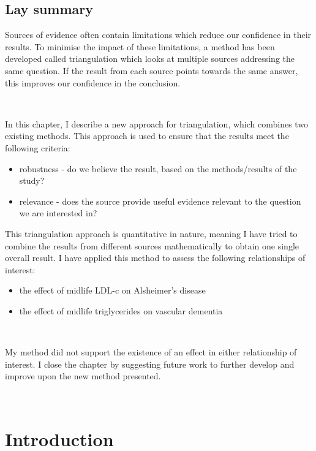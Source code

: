 \documentclass[a4paper, twoside]{templates/ociamthesis}
\providecommand{\tightlist}{%
  \setlength{\itemsep}{0pt}\setlength{\parskip}{0pt}}
\begin{document}
\begin{laybox}

\hypertarget{lay-summary-6}{%
\section*{Lay summary}\label{lay-summary-6}}

Sources of evidence often contain limitations which reduce our confidence in their results. To minimise the impact of these limitations, a method has been developed called triangulation which looks at multiple sources addressing the same question. If the result from each source points towards the same answer, this improves our confidence in the conclusion.

~

In this chapter, I describe a new approach for triangulation, which combines two existing methods. This approach is used to ensure that the results meet the following criteria:

\begin{itemize}
\tightlist
\item
  robustness - do we believe the result, based on the methods/results of the study?
\item
  relevance - does the source provide useful evidence relevant to the question we are interested in?
\end{itemize}

This triangulation approach is quantitative in nature, meaning I have tried to combine the results from different sources mathematically to obtain one single overall result. I have applied this method to assess the following relationships of interest:

\begin{itemize}
\tightlist
\item
  the effect of midlife LDL-c on Alsheimer's disease
\item
  the effect of midlife triglycerides on vascular dementia
\end{itemize}

~

My method did not support the existence of an effect in either relationship of interest. I close the chapter by suggesting future work to further develop and improve upon the new method presented.

\end{laybox}

~

\hypertarget{triangulation-overview}{%
\section{Introduction}\label{triangulation-overview}}
\end{document}
